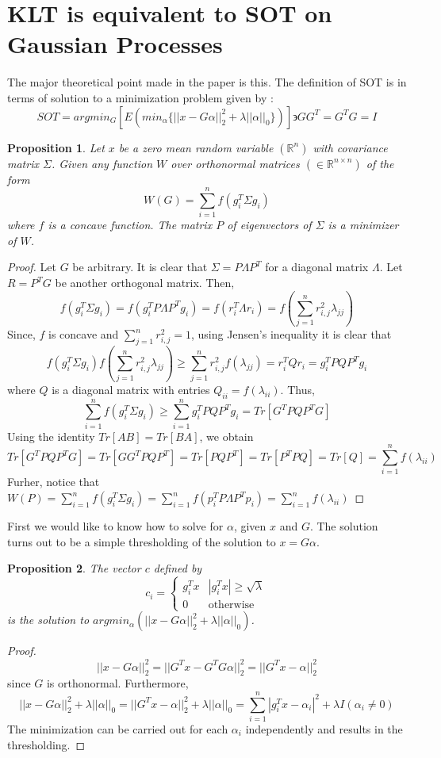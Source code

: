 \documentclass{article}
\newtheorem{prp}{Proposition}
\theoremstyle{remark}
\newcommand{\bR}{\mathbb{R}}
\begin{document}
\section*{KLT is equivalent to SOT on Gaussian Processes}
The major theoretical point made in the paper is this. The definition of SOT is in terms of solution to a minimization problem given by :
$$SOT = argmin_{G}[ E( min_\alpha \{||x-G\alpha||_2^2 + \lambda||\alpha||_0\} ) ] \backepsilon GG^T = G^TG = I$$
\begin{prp}
Let $x$ be a zero mean random variable $(\bR^n)$ with covariance matrix $\Sigma$. Given any function $W$ over orthonormal matrices $(\in \bR^{n\times n})$ of the form
$$W(G) = \sum_{i=1}^n f(g_i^T \Sigma g_i)$$
where $f$ is a concave function. The matrix $P$ of eigenvectors of $\Sigma$ is a minimizer of $W$.
\end{prp}
\begin{proof}
Let $G$ be arbitrary. It is clear that $\Sigma = P\Lambda P^T$ for a diagonal matrix $\Lambda$. Let $R = P^TG$ be another orthogonal matrix. Then,
$$ f(g_i^T\Sigma g_i) = f(g_i^T P \Lambda P^T g_i) = f(r_i^T \Lambda r_i) = f(\sum_{j=1}^n r_{i,j}^2 \lambda_{jj})$$
Since, $f$ is concave and $\sum_{j=1}^n r_{i,j}^2 = 1$, using Jensen's inequality it is clear that
$$f(g_i^T\Sigma g_i) f(\sum_{j=1}^n r_{i,j}^2 \lambda_{jj}) \geq \sum_{j=1}^n r_{i,j}^2 f(\lambda_{jj}) = r_i^T Q r_i = g_i^T PQP^T g_i$$
where $Q$ is a diagonal matrix with entries $Q_{ii} = f(\lambda_{ii})$. Thus,
$$\sum_{i=1}^n f(g_i^T\Sigma g_i) \geq \sum_{i=1}^n g_i^T PQP^T g_i = Tr[G^TPQP^TG]$$
Using the identity $Tr[AB] = Tr[BA]$, we obtain
$$Tr[G^TPQP^TG] = Tr[GG^TPQP^T] = Tr[PQP^T] = Tr[P^TPQ] = Tr[Q] = \sum_{i=1}^n f(\lambda_{ii})$$
Furher, notice that $W(P) = \sum_{i=1}^n f(g_i^T \Sigma g_i) = \sum_{i=1}^n f(p_i^T P \Lambda P^T p_i) = \sum_{i=1}^n f(\lambda_{ii})$
\end{proof}
First we would like to know how to solve for $\alpha$, given $x$ and $G$. The solution turns out to be a simple thresholding of the solution to $x = G\alpha$.
\begin{prp}
The vector $c$ defined by
$$c_i = \begin{cases}
	g_i^T x & |g_i^T x| \geq \sqrt{\lambda}\\
	0 & \text{otherwise}
\end{cases}$$
is the solution to $argmin_\alpha (||x - G\alpha||_2^2 + \lambda||\alpha||_0)$.
\end{prp}
\begin{proof}
$$||x-G\alpha||_2^2 = ||G^Tx - G^TG\alpha||_2^2 = ||G^Tx - \alpha||_2^2$$
since $G$ is orthonormal. Furthermore,
$$||x - G\alpha||_2^2 + \lambda||\alpha||_0 = ||G^Tx - \alpha||_2^2 + \lambda||\alpha||_0 = \sum_{i=1}^n |g_i^Tx - \alpha_i|^2 + \lambda I(\alpha_i \neq 0)$$
The minimization can be carried out for each $\alpha_i$ independently and results in the thresholding.
\end{proof} 
\end{document}
